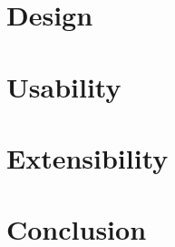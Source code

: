 \documentclass[a4paper,12pt,twocolumn]{article}
\begin{document}
\section{Design}
\lipsum[4]

\section{Usability}
\lipsum[5]

\section{Extensibility}
\lipsum[6]

\section{Conclusion}
\lipsum[7]

{}

\end{document}
